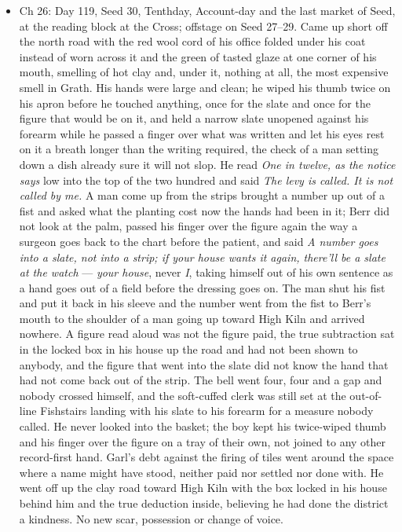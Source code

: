 \documentclass{design/chronicle}
\begin{document}
{\begin{itemize}[leftmargin=1.4em,itemsep=1pt,topsep=3pt,parsep=0pt]
\item Ch 26: Day 119, Seed 30, Tenthday, Account-day and the last market of Seed, at the reading block at the Cross; offstage on Seed 27–29. Came up short off the north road with the red wool cord of his office folded under his coat instead of worn across it and the green of tasted glaze at one corner of his mouth, smelling of hot clay and, under it, nothing at all, the most expensive smell in Grath. His hands were large and clean; he wiped his thumb twice on his apron before he touched anything, once for the slate and once for the figure that would be on it, and held a narrow slate unopened against his forearm while he passed a finger over what was written and let his eyes rest on it a breath longer than the writing required, the check of a man setting down a dish already sure it will not slop. He read \emph{One in twelve, as the notice says} low into the top of the two hundred and said \emph{The levy is called. It is not called by me.} A man come up from the strips brought a number up out of a fist and asked what the planting cost now the hands had been in it; Berr did not look at the palm, passed his finger over the figure again the way a surgeon goes back to the chart before the patient, and said \emph{A number goes into a slate, not into a strip; if your house wants it again, there’ll be a slate at the watch} — \emph{your house}, never \emph{I}, taking himself out of his own sentence as a hand goes out of a field before the dressing goes on. The man shut his fist and put it back in his sleeve and the number went from the fist to Berr’s mouth to the shoulder of a man going up toward High Kiln and arrived nowhere. A figure read aloud was not the figure paid, the true subtraction sat in the locked box in his house up the road and had not been shown to anybody, and the figure that went into the slate did not know the hand that had not come back out of the strip. The bell went four, four and a gap and nobody crossed himself, and the soft-cuffed clerk was still set at the out-of-line Fishstairs landing with his slate to his forearm for a measure nobody called. He never looked into the basket; the boy kept his twice-wiped thumb and his finger over the figure on a tray of their own, not joined to any other record-first hand. Garl’s debt against the firing of tiles went around the space where a name might have stood, neither paid nor settled nor done with. He went off up the clay road toward High Kiln with the box locked in his house behind him and the true deduction inside, believing he had done the district a kindness. No new scar, possession or change of voice.


\end{itemize}}
\end{document}
